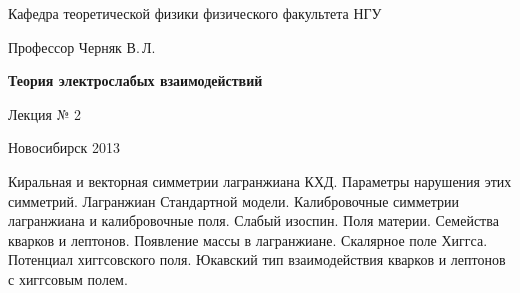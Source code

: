 \documentclass[12pt,pagesize,paper=192mm:108mm]{scrbook}
\begin{document}
\begin{titlepage}
\begin{center}
    Кафедра теоретической физики физического факультета НГУ
    \medskip

    \Large
    Профессор Черняк В.\,Л.
    \bigskip

    \huge
    \textbf{Теория электрослабых взаимодействий}
    \bigskip

    \Large
    Лекция № 2
    \vfill

    \vfill

    \normalsize  Новосибирск 2013
    \smallskip
    
    \ccbysa
  \end{center}
\end{titlepage}

\newpage

\vspace*{-1em}
\begin{center}
 \vfill
  \begin{minipage}{0.66\linewidth}
    Киральная и векторная симметрии лагранжиана КХД. Параметры
    нарушения этих симметрий.  Лагранжиан Стандартной
    модели. Калибровочные симметрии лагранжиана и калибровочные поля.
    Слабый изоспин. Поля материи. Семейства кварков и
    лептонов. Появление массы в лагранжиане.  Скалярное поле
    Хиггса. Потенциал хиггсовского поля. Юкавский тип взаимодействия
    кварков и лептонов с хиггсовым полем.
  \end{minipage}
  \vfill
\end{center}
\end{document}
